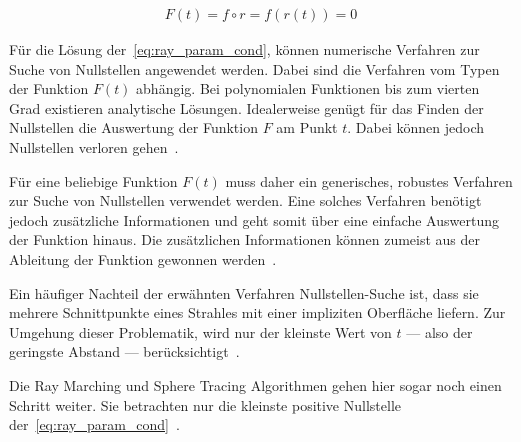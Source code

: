\begin{gather}\label{eq:ray_param_cond}
    F(t) = f \circ r = f(r(t)) = 0
\end{gather}

Für die Lösung der~\autoref{eq:ray_param_cond}, können numerische
Verfahren zur Suche von Nullstellen angewendet werden. Dabei sind die
Verfahren vom Typen der Funktion $F(t)$ abhängig. Bei polynomialen
Funktionen bis zum vierten Grad existieren analytische Lösungen.
Idealerweise genügt für das Finden der Nullstellen die Auswertung der
Funktion $F$ am Punkt $t$. Dabei können jedoch Nullstellen verloren
gehen~\parencite[S. 528]{hart_sphere_1994}.

Für eine beliebige Funktion $F(t)$ muss daher ein generisches, robustes
Verfahren zur Suche von Nullstellen verwendet werden. Eine solches
Verfahren benötigt jedoch zusätzliche Informationen und geht somit über
eine einfache Auswertung der Funktion hinaus. Die zusätzlichen
Informationen können zumeist aus der Ableitung der Funktion gewonnen
werden~\parencite[S. 528]{hart_sphere_1994}.

Ein häufiger Nachteil der erwähnten Verfahren Nullstellen-Suche ist,
dass sie mehrere Schnittpunkte eines Strahles mit einer impliziten
Oberfläche liefern. Zur Umgehung dieser Problematik, wird nur der
kleinste Wert von $t$ --- also der geringste Abstand ---
berücksichtigt~\parencite[S. 531]{hart_sphere_1994}.

Die Ray Marching und Sphere Tracing Algorithmen gehen hier sogar noch
einen Schritt weiter. Sie betrachten nur die kleinste positive Nullstelle
der~\autoref{eq:ray_param_cond}~\parencite[S. 531]{hart_sphere_1994}.





